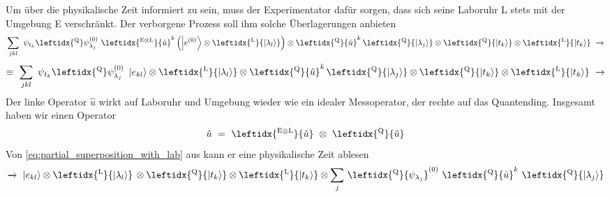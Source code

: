 \documentclass[12pt]{article}
\begin{document}
Um über die physikalische Zeit informiert zu sein, muss der Experimentator dafür sorgen, dass sich seine Laboruhr L stets mit der Umgebung E verschränkt. Der verborgene Prozess soll ihm solche Überlagerungen anbieten
\begin{equation*}
\sum_{jkl} \ \psi_{t_k} \leftidx{^\mathrm{Q}}\psi_{\lambda_j}^{(0)}\ 
\leftidx{^\mathrm{E \otimes L}}{\hat{u}}^k \left( \ket{e^{(0)}} \otimes \leftidx{^\mathrm{L}}{\ket{\lambda_l}} \right) 
\otimes \leftidx{^\mathrm{Q}}{\hat{u}}^{k}\, \leftidx{^\mathrm{Q}}{\ket{\lambda_j}}
\otimes \leftidx{^\mathrm{Q}}{\ket{t_k}}
\otimes \leftidx{^\mathrm{L}}{\ket{t_k}}
\ \xrightarrow{}
\end{equation*}
\begin{equation}
\label{eq:partial_superposition_with_lab}
\equiv\ \sum_{jkl} \ \psi_{t_k} \leftidx{^\mathrm{Q}}\psi_{\lambda_j}^{(0)}\ 
\ket{e_{kl}} 
\otimes \leftidx{^\mathrm{L}}{\ket{\lambda_l}} 
\otimes \leftidx{^\mathrm{Q}}{\hat{u}}^{k}\, \leftidx{^\mathrm{Q}}{\ket{\lambda_j}}
\otimes \leftidx{^\mathrm{Q}}{\ket{t_k}}
\otimes \leftidx{^\mathrm{L}}{\ket{t_k}}
\ \xrightarrow{}
\end{equation}
Der linke Operator $\hat{u}$ wirkt auf Laboruhr und Umgebung wieder wie ein idealer Messoperator, der rechte auf das Quantending. Insgesamt haben wir einen Operator
\begin{equation}
\label{eq:unitary_2_parts}
\hat{u}\ =\ \leftidx{^\mathrm{E \otimes L}}{\hat{u}}\ \otimes\ \leftidx{^\mathrm{Q}}{\hat{u}}
\end{equation}
Von \eqref{eq:partial_superposition_with_lab} aus kann er eine physikalische Zeit ablesen
\begin{equation*}
\xrightarrow{} \ \ket{e_{kl}} 
\otimes \leftidx{^\mathrm{L}}{\ket{\lambda_l}} \,
\otimes \leftidx{^\mathrm{Q}}{\ket{t_k}}
\otimes \leftidx{^\mathrm{L}}{\ket{t_k}}
\otimes \sum_{j} \, \leftidx{^\mathrm{Q}}{\psi_{\lambda_j}}^{(0)}\ 
\leftidx{^\mathrm{Q}}{\hat{u}}^{k}\ 
\leftidx{^\mathrm{Q}}{\ket{\lambda_j}}
\end{equation*}
\end{document}
